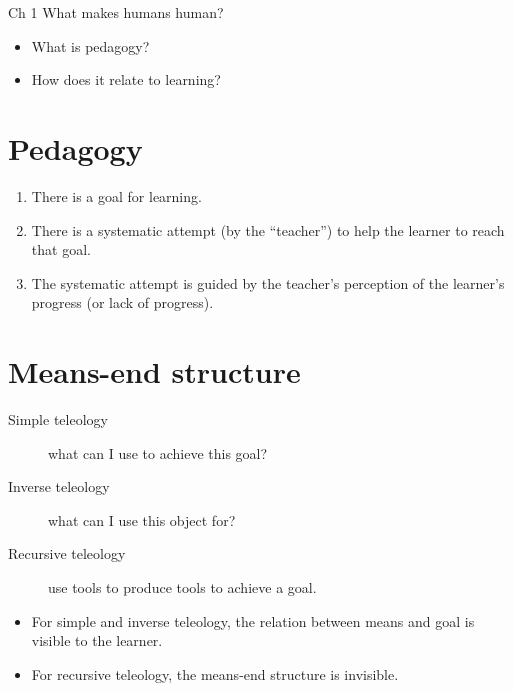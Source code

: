 \begin{frame}
  \begin{block}{Ch 1 What makes humans human?}
    \begin{itemize}
      \item What is pedagogy?
      \item How does it relate to learning?
    \end{itemize}
  \end{block}
\end{frame}

\section{Pedagogy}

\begin{frame}
  \begin{definition}
    \begin{enumerate}
      \item There is a goal for learning.
      \item There is a systematic attempt (by the \enquote{teacher}) to help 
        the learner to reach that goal.
      \item The systematic attempt is guided by the teacher's perception of the 
        learner's progress (or lack of progress).
    \end{enumerate}
  \end{definition}
\end{frame}

\section{Means-end structure}

\begin{frame}
  \begin{definition}[Teleology]
    \begin{description}
      \item[Simple teleology] what can I use to achieve this goal?
      \item[Inverse teleology] what can I use this object for?
      \item[Recursive teleology] use tools to produce tools to achieve a goal.
    \end{description}
  \end{definition}

  \pause

  \begin{remark}
    \begin{itemize}
      \item For simple and inverse teleology, the relation between means and 
        goal is visible to the learner.
      \item For recursive teleology, the means-end structure is invisible.
    \end{itemize}
  \end{remark}
\end{frame}

